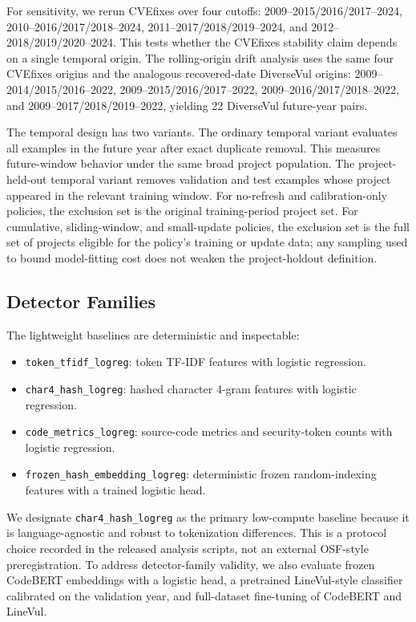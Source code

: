 \documentclass[a4paper,fleqn]{cas-dc}
\begin{document}
For sensitivity, we rerun CVEfixes over four cutoffs:
2009--2015/2016/2017--2024, 2010--2016/2017/2018--2024,
2011--2017/2018/2019--2024, and 2012--2018/2019/2020--2024. This tests whether
the CVEfixes stability claim depends on a single temporal origin. The
rolling-origin drift analysis uses the same four CVEfixes origins and the
analogous recovered-date DiverseVul origins:
2009--2014/2015/2016--2022, 2009--2015/2016/2017--2022,
2009--2016/2017/2018--2022, and 2009--2017/2018/2019--2022, yielding 22
DiverseVul future-year pairs.

The temporal design has two variants. The ordinary temporal variant evaluates
all examples in the future year after exact duplicate removal. This measures
future-window behavior under the same broad project population. The
project-held-out temporal variant removes validation and test examples whose
project appeared in the relevant training window. For no-refresh and
calibration-only policies, the exclusion set is the original training-period
project set. For cumulative, sliding-window, and small-update policies, the
exclusion set is the full set of projects eligible for the policy's training
or update data; any sampling used to bound model-fitting cost does not weaken
the project-holdout definition.

\subsection{Detector Families}

The lightweight baselines are deterministic and inspectable:

\begin{itemize}
  \item \texttt{token\_tfidf\_logreg}: token TF-IDF features with logistic
  regression.
  \item \texttt{char4\_hash\_logreg}: hashed character 4-gram features with
  logistic regression.
  \item \texttt{code\_metrics\_logreg}: source-code metrics and security-token
  counts with logistic regression.
  \item \texttt{frozen\_hash\_embedding\_logreg}: deterministic frozen
  random-indexing features with a trained logistic head.
\end{itemize}

We designate \texttt{char4\_hash\_logreg} as the primary low-compute baseline
because it is language-agnostic and robust to tokenization differences. This is
a protocol choice recorded in the released analysis scripts, not an external
OSF-style preregistration. To address detector-family validity, we also
evaluate frozen CodeBERT embeddings with a logistic head, a pretrained
LineVul-style classifier calibrated on the validation year, and full-dataset
fine-tuning of CodeBERT and LineVul.
\end{document}

